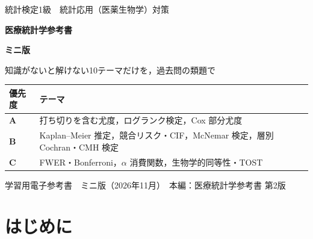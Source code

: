 

\begin{titlepage}
\vspace*{8mm}
\begin{center}
{\color{white}\large 統計検定1級　統計応用（医薬生物学）対策\par}
\vspace{10mm}
{\color{white}\fontsize{30}{40}\selectfont\bfseries 医療統計学参考書\par}
\vspace{4mm}
{\color{white}\fontsize{20}{28}\selectfont\bfseries ミニ版\par}
\vspace{4mm}
{\color{white}\large 知識がないと解けない10テーマだけを，過去問の類題で\par}
\end{center}
\vspace{36mm}
\begin{center}\small
\begin{tabular}{@{}lL{110mm}@{}}
\toprule
優先度 & テーマ\\
\midrule
\textbf{A} & 打ち切りを含む尤度，ログランク検定，Cox 部分尤度\\
\textbf{B} & Kaplan--Meier 推定，競合リスク・CIF，McNemar 検定，層別 Cochran・CMH 検定\\
\textbf{C} & FWER・Bonferroni，$\alpha$ 消費関数，生物学的同等性・TOST\\
\bottomrule
\end{tabular}
\end{center}
\vfill
\begin{center}
{\small 学習用電子参考書　ミニ版（2026年11月）　本編：医療統計学参考書 第2版}
\end{center}
\end{titlepage}

\frontmatter
{}

\chapter*{はじめに}

